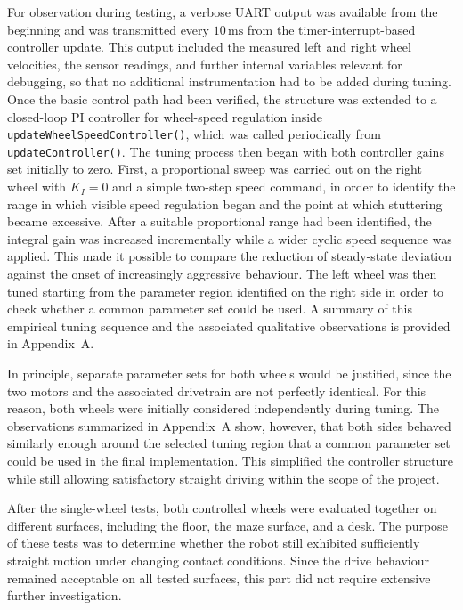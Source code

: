 For observation during testing, a verbose UART output was available from the beginning and was transmitted every $10\,\mathrm{ms}$ from the timer-interrupt-based controller update. This output included the measured left and right wheel velocities, the sensor readings, and further internal variables relevant for debugging, so that no additional instrumentation had to be added during tuning. Once the basic control path had been verified, the structure was extended to a closed-loop PI controller for wheel-speed regulation inside \texttt{updateWheelSpeedController()}, which was called periodically from \texttt{updateController()}. The tuning process then began with both controller gains set initially to zero. First, a proportional sweep was carried out on the right wheel with $K_I = 0$ and a simple two-step speed command, in order to identify the range in which visible speed regulation began and the point at which stuttering became excessive. After a suitable proportional range had been identified, the integral gain was increased incrementally while a wider cyclic speed sequence was applied. This made it possible to compare the reduction of steady-state deviation against the onset of increasingly aggressive behaviour. The left wheel was then tuned starting from the parameter region identified on the right side in order to check whether a common parameter set could be used. A summary of this empirical tuning sequence and the associated qualitative observations is provided in Appendix~A.

In principle, separate parameter sets for both wheels would be justified, since the two motors and the associated drivetrain are not perfectly identical. For this reason, both wheels were initially considered independently during tuning. The observations summarized in Appendix~A show, however, that both sides behaved similarly enough around the selected tuning region that a common parameter set could be used in the final implementation. This simplified the controller structure while still allowing satisfactory straight driving within the scope of the project.

After the single-wheel tests, both controlled wheels were evaluated together on different surfaces, including the floor, the maze surface, and a desk. The purpose of these tests was to determine whether the robot still exhibited sufficiently straight motion under changing contact conditions. Since the drive behaviour remained acceptable on all tested surfaces, this part did not require extensive further investigation.

